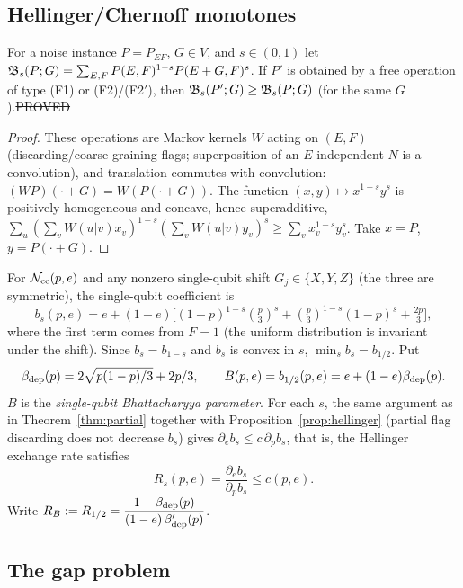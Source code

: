 \subsection{Hellinger/Chernoff monotones}

\begin{proposition}\label{prop:hellinger}
For a noise instance $P=P_{EF}$, $G\in V$, and $s\in(0,1)$ let
$\mathfrak{B}_s(P;G)=\sum_{E,F}P(E,F)^{1-s}P(E+G,F)^s$.
If $P'$ is obtained by a free operation of type (F1) or (F2)/(F2$'$), then $\mathfrak{B}_s(P';G)\ge\mathfrak{B}_s(P;G)$ (for the same $G$).\hfill\st{PROVED}
\end{proposition}
\begin{proof}
These operations are Markov kernels $W$ acting on $(E,F)$ (discarding/coarse-graining flags; superposition of an $E$-independent $N$ is a convolution),
and translation commutes with convolution: $(WP)(\cdot+G)=W(P(\cdot+G))$. The function $(x,y)\mapsto x^{1-s}y^s$ is positively homogeneous and concave, hence superadditive,
$\sum_u(\sum_vW(u|v)x_v)^{1-s}(\sum_vW(u|v)y_v)^s\ge\sum_v x_v^{1-s}y_v^s$. Take $x=P$, $y=P(\cdot+G)$.
\end{proof}

For $\mathcal{N}_{\rm cc}(p,e)$ and any nonzero single-qubit shift $G_j\in\{X,Y,Z\}$ (the three are symmetric), the single-qubit coefficient is
\[
b_s(p,e)=e+(1-e)\Big[(1-p)^{1-s}(\tfrac p3)^s+(\tfrac p3)^{1-s}(1-p)^s+\tfrac{2p}3\Big],
\]
where the first term comes from $F=1$ (the uniform distribution is invariant under the shift). Since $b_s=b_{1-s}$ and $b_s$ is convex in $s$, $\min_s b_s=b_{1/2}$. Put
\[
\beta_{\rm dep}(p)=2\sqrt{p(1-p)/3}+2p/3,\qquad B(p,e)=b_{1/2}(p,e)=e+(1-e)\beta_{\rm dep}(p).
\]
$B$ is the \emph{single-qubit Bhattacharyya parameter}. For each $s$, the same argument as in Theorem~\ref{thm:partial} together with Proposition~\ref{prop:hellinger}
(partial flag discarding does not decrease $b_s$) gives $\partial_eb_s\le c\,\partial_pb_s$, that is, the Hellinger exchange rate satisfies
\[
R_s(p,e)=\frac{\partial_eb_s}{\partial_pb_s}\le c(p,e).
\]
Write $R_B:=R_{1/2}=\dfrac{1-\beta_{\rm dep}(p)}{(1-e)\,\beta_{\rm dep}'(p)}$.

\subsection{The gap problem}\label{sec:gap}

